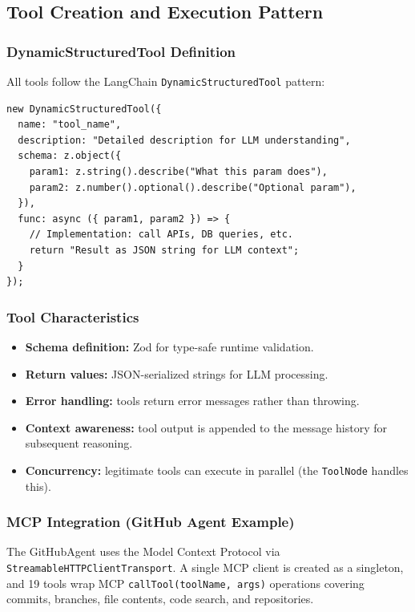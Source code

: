 \documentclass[11pt,a4paper]{report}
\newcommand{\code}[1]{\texttt{\small #1}}
\begin{document}
\subsection{Tool Creation and Execution Pattern}

\subsubsection{DynamicStructuredTool Definition}

All tools follow the LangChain \code{DynamicStructuredTool} pattern:

\begin{lstlisting}[style=tsstyle]
new DynamicStructuredTool({
  name: "tool_name",
  description: "Detailed description for LLM understanding",
  schema: z.object({
    param1: z.string().describe("What this param does"),
    param2: z.number().optional().describe("Optional param"),
  }),
  func: async ({ param1, param2 }) => {
    // Implementation: call APIs, DB queries, etc.
    return "Result as JSON string for LLM context";
  }
});
\end{lstlisting}

\subsubsection{Tool Characteristics}

\begin{itemize}
  \item \textbf{Schema definition:} Zod for type-safe runtime validation.
  \item \textbf{Return values:} JSON-serialized strings for LLM processing.
  \item \textbf{Error handling:} tools return error messages rather than throwing.
  \item \textbf{Context awareness:} tool output is appended to the message history for subsequent reasoning.
  \item \textbf{Concurrency:} legitimate tools can execute in parallel (the \code{ToolNode} handles this).
\end{itemize}

\subsubsection{MCP Integration (GitHub Agent Example)}

The GitHubAgent uses the Model Context Protocol via
\code{StreamableHTTPClientTransport}. A single MCP client is created as a
singleton, and 19 tools wrap MCP \code{callTool(toolName, args)} operations
covering commits, branches, file contents, code search, and repositories.
\end{document}
